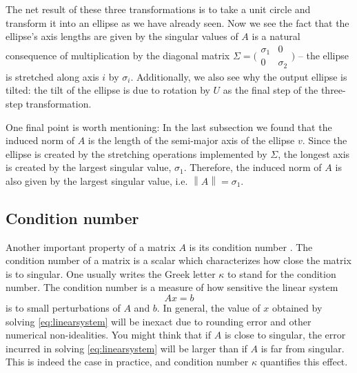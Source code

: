 \documentclass[onefignum,onetabnum]{siamart190516}
\begin{document}
The net result of these three transformations is to take a unit circle
and transform it into an ellipse as we have already seen.  Now we see the 
fact that the ellipse's axis lengths are given by the singular values of $A$
is a natural consequence of multiplication by the diagonal matrix 
$\Sigma = \bigl( \begin{smallmatrix}  \sigma_1 & 0 \\ 0 & \sigma_2 \end{smallmatrix}\bigr)$
-- the ellipse
is stretched along axis $i$ by $\sigma_i$.
Additionally, we also see
why the output ellipse is tilted:  the tilt of the ellipse is due to
rotation by $U$ as the final step of the three-step transformation.

One final point is worth mentioning:  In the last subsection we found that
the induced norm of $A$ is the length of the semi-major axis of the ellipse $v$.
Since the ellipse is created by the stretching operations implemented by
$\Sigma$, the longest axis is created by the largest singular value, $\sigma_1$.
Therefore, the induced norm of $A$ is also given by the largest singular value, i.e.
$\left\lVert{A}\right\rVert = \sigma_1$.


\subsection{Condition number}
\label{conditionnumber}
Another important property of a matrix $A$ is its condition number \cite{moler2017}.  The
condition number of a matrix is a scalar which characterizes how close
the matrix is to singular.  One usually writes the Greek letter $\kappa$ 
to stand for the condition number.  The condition number is a measure of how
sensitive the linear system
\begin{equation}
  \label{eq:linearsystem}
Ax = b
\end{equation}
is to small perturbations of $A$ and $b$.  In general, the value 
of $x$ obtained by solving \cref{eq:linearsystem} will be 
inexact due to rounding error and other numerical non-idealities.
You might think that if $A$ is close to singular, the
error incurred in solving \cref{eq:linearsystem} will be larger than
if $A$ is far from singular.  This is indeed the case in  
practice, and condition number $\kappa$ quantifies this effect.
\end{document}
